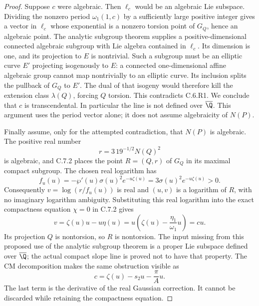 \begin{proof}
Suppose $c$ were algebraic. Then $\ell_c$ would be an
algebraic Lie subspace. Dividing the nonzero period
$\omega_1(1,c)$ by a sufficiently large positive integer
gives a vector in $\ell_c$ whose exponential is a nonzero
torsion point of $G_Q$, hence an algebraic point. The
analytic subgroup theorem
\citep[Theorem 6.1]{huber2022} supplies a positive-dimensional
connected algebraic subgroup with Lie algebra contained in
$\ell_c$. Its dimension is one, and its projection to $E$
is nontrivial. Such a subgroup must be an elliptic curve
$E'$ projecting isogenously to $E$: a connected
one-dimensional affine algebraic group cannot map
nontrivially to an elliptic curve. Its inclusion splits the
pullback of $G_Q$ to $E'$. The dual of that isogeny would
therefore kill the extension class $\lambda(Q)$, forcing
$Q$ torsion. This contradicts C.6.R1. We conclude that $c$
is transcendental. In particular the line is not defined over
$\overline\Q$. This argument uses the period vector alone;
it does not assume algebraicity of $N(P)$.

Finally assume, only for the attempted contradiction, that
$N(P)$ is algebraic. The positive real number
\[
 r=3\,19^{-1/2}N(Q)^2
\]
is algebraic, and C.7.2 places the point $R=(Q,r)$ of
$G_Q$ in its maximal compact subgroup. The chosen real
logarithm has
\[
 f_u(u)=-\wp'(u)\sigma(u)^2e^{-u\zeta(u)}
        =3\sigma(u)^2e^{-u\zeta(u)}>0.
\]
Consequently $v=\log(r/f_u(u))$ is real and
$(u,v)$ is a logarithm of $R$, with no imaginary logarithm
ambiguity. Substituting this real logarithm into the exact
compactness equation $\chi=0$ in C.7.2 gives
\[
 v=\zeta(u)u-u\eta(u)
   =u\left(\zeta(u)-\frac{\eta_1}{\omega_1}u\right)=cu.
\]
Its projection $Q$ is nontorsion, so $R$ is nontorsion.
The input missing from this proposed use of the analytic
subgroup theorem is a proper Lie subspace defined over
$\overline\Q$; the actual compact slope line is proved
not to have that property. The CM decomposition makes the
same obstruction visible as
\[
 c=\zeta(u)-s_2u-\frac{\pi}{A}u.
\]
The last term is the derivative of the real Gaussian
correction. It cannot be discarded while retaining the
compactness equation.
\end{proof}
